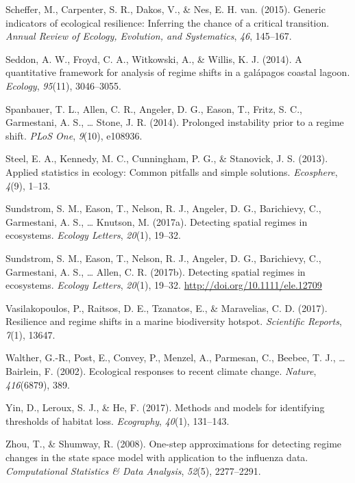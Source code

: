 \documentclass[12pt,twoside,openany]{reedthesis}
\begin{document}
\leavevmode\hypertarget{ref-scheffer2015generic}{}%
Scheffer, M., Carpenter, S. R., Dakos, V., \& Nes, E. H. van. (2015). Generic indicators of ecological resilience: Inferring the chance of a critical transition. \emph{Annual Review of Ecology, Evolution, and Systematics}, \emph{46}, 145--167.

\leavevmode\hypertarget{ref-seddon2014quantitative}{}%
Seddon, A. W., Froyd, C. A., Witkowski, A., \& Willis, K. J. (2014). A quantitative framework for analysis of regime shifts in a galápagos coastal lagoon. \emph{Ecology}, \emph{95}(11), 3046--3055.

\leavevmode\hypertarget{ref-spanbauer_prolonged_2014}{}%
Spanbauer, T. L., Allen, C. R., Angeler, D. G., Eason, T., Fritz, S. C., Garmestani, A. S., \ldots{} Stone, J. R. (2014). Prolonged instability prior to a regime shift. \emph{PLoS One}, \emph{9}(10), e108936.

\leavevmode\hypertarget{ref-steel2013applied}{}%
Steel, E. A., Kennedy, M. C., Cunningham, P. G., \& Stanovick, J. S. (2013). Applied statistics in ecology: Common pitfalls and simple solutions. \emph{Ecosphere}, \emph{4}(9), 1--13.

\leavevmode\hypertarget{ref-sundstrom_detecting_2017}{}%
Sundstrom, S. M., Eason, T., Nelson, R. J., Angeler, D. G., Barichievy, C., Garmestani, A. S., \ldots{} Knutson, M. (2017a). Detecting spatial regimes in ecosystems. \emph{Ecology Letters}, \emph{20}(1), 19--32.

\leavevmode\hypertarget{ref-sundstrom2017detecting}{}%
Sundstrom, S. M., Eason, T., Nelson, R. J., Angeler, D. G., Barichievy, C., Garmestani, A. S., \ldots{} Allen, C. R. (2017b). Detecting spatial regimes in ecosystems. \emph{Ecology Letters}, \emph{20}(1), 19--32. \url{http://doi.org/10.1111/ele.12709}

\leavevmode\hypertarget{ref-vasilakopoulos2017resilience}{}%
Vasilakopoulos, P., Raitsos, D. E., Tzanatos, E., \& Maravelias, C. D. (2017). Resilience and regime shifts in a marine biodiversity hotspot. \emph{Scientific Reports}, \emph{7}(1), 13647.

\leavevmode\hypertarget{ref-walther_ecological_2002}{}%
Walther, G.-R., Post, E., Convey, P., Menzel, A., Parmesan, C., Beebee, T. J., \ldots{} Bairlein, F. (2002). Ecological responses to recent climate change. \emph{Nature}, \emph{416}(6879), 389.

\leavevmode\hypertarget{ref-yin2017methods}{}%
Yin, D., Leroux, S. J., \& He, F. (2017). Methods and models for identifying thresholds of habitat loss. \emph{Ecography}, \emph{40}(1), 131--143.

\leavevmode\hypertarget{ref-zhou2008one}{}%
Zhou, T., \& Shumway, R. (2008). One-step approximations for detecting regime changes in the state space model with application to the influenza data. \emph{Computational Statistics \& Data Analysis}, \emph{52}(5), 2277--2291.
\end{document}
